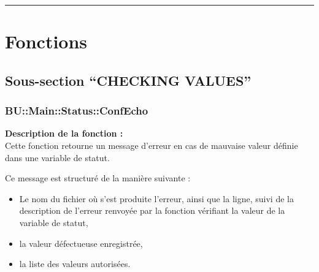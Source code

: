 \documentclass[a4paper,10pt]{article}
\begin{document}

\color{red}\par\noindent\rule{\textwidth}{0.4pt}\color{white}

\color{red}
\section{Fonctions}\color{white}

\color{green}
\subsection{Sous-section ``CHECKING VALUES''}

\color{blue}
\subsubsection{BU::Main::Status::ConfEcho}\color{white}

\begin{justify}
\textbf{Description de la fonction :}\\
    Cette fonction retourne un message d'erreur en cas de mauvaise valeur définie dans une variable de statut.
\end{justify}

\begin{justify}
   	Ce message est structuré de la manière suivante :

   	\begin{itemize}
   		\item Le nom du fichier où s'est produite l'erreur, ainsi que la ligne, suivi de la description de l'erreur renvoyée par la fonction vérifiant la valeur de la variable de statut,\\

   		\item la valeur défectueuse enregistrée,\\

   		\item la liste des valeurs autorisées.
   	\end{itemize}
\end{justify}
\end{document}

